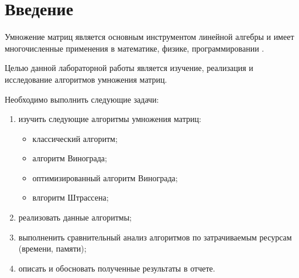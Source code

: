 \chapter*{Введение}

Умножение матриц является основным инструментом линейной алгебры и имеет многочисленные применения в математике, физике, программировании \cite{winograd-haskell}.

Целью данной лабораторной работы является изучение, реализация и исследование алгоритмов умножения матриц.

Необходимо выполнить следующие задачи:
\begin{enumerate}[]
    \item изучить следующие алгоритмы умножения матриц:
    \begin{itemize}
        \item классический алгоритм;
        \item алгоритм Винограда;
        \item оптимизированный алгоритм Винограда;
        \item влгоритм Штрассена;
    \end{itemize}
    \item реализовать данные алгоритмы;
    \item выполненить сравнительный анализ алгоритмов по затрачиваемым ресурсам (времени, памяти);
    \item описать и обосновать полученные результаты в отчете.
\end{enumerate}